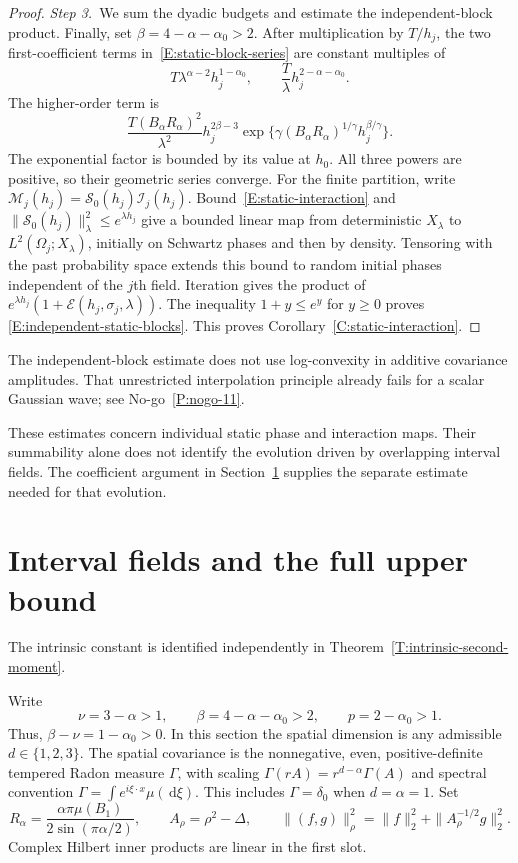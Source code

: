 \documentclass[12pt,oneside,openany]{book}
\numberwithin{equation}{section}
\theoremstyle{nogostyle}
\theoremstyle{definition}
\newcommand{\ud}{\,\mathrm{d}}
\begin{document}
\begin{proof}
  \medskip
  \noindent\textit{Step 3.~}We sum the dyadic budgets and estimate the
  independent-block product.
  Finally, set $\beta = 4-\alpha-\alpha_0 > 2$. After multiplication by $T/h_j$,
  the two first-coefficient terms in~\eqref{E:static-block-series} are constant
  multiples of
  \[
    T\lambda^{\alpha-2}h_j^{1-\alpha_0},\qquad
    \frac T\lambda h_j^{2-\alpha-\alpha_0}.
  \]
  The higher-order term is
  \[
    \frac{T(B_\alpha R_\alpha)^2}{\lambda^2}
    h_j^{2\beta-3}
    \exp\{\gamma(B_\alpha R_\alpha)^{1/\gamma}h_j^{\beta/\gamma}\}.
  \]
  The exponential factor is bounded by its value at $h_0$. All three powers are
  positive, so their geometric series converge. For the finite partition, write
  $\mathcal{M}_j(h_j) = \mathcal{S}_0(h_j)\mathcal{I}_j(h_j)$.
  Bound~\eqref{E:static-interaction} and $\|\mathcal{S}_0(h_j)\|_\lambda^2 \le
  e^{\lambda h_j}$ give a bounded linear map from deterministic $X_\lambda$ to
  $L^2(\Omega_j;X_\lambda)$, initially on Schwartz phases and then by density.
  Tensoring with the past probability space extends this bound to random initial
  phases independent of the $j$th field. Iteration gives the product of
  $e^{\lambda h_j}(1+\mathcal{E}(h_j,\sigma_j,\lambda))$. The inequality $1+y
  \le e^y$ for $y \ge 0$ proves \eqref{E:independent-static-blocks}. This proves
  Corollary~\ref{C:static-interaction}.
\end{proof}

The independent-block estimate does not use log-convexity in additive
covariance amplitudes. That unrestricted interpolation principle already
fails for a scalar Gaussian wave; see No-go~\ref{P:nogo-11}.


These estimates concern individual static phase and interaction maps. Their
summability alone does not identify the evolution driven by overlapping interval
fields. The coefficient argument in Section~\ref{S:interval-upper} supplies the
separate estimate needed for that evolution.

\section{Interval fields and the full upper bound}
\label{S:interval-upper}

The intrinsic constant is identified independently in
Theorem~\ref{T:intrinsic-second-moment}.

Write
\[
  \nu=3-\alpha>1,\qquad
  \beta=4-\alpha-\alpha_0>2,\qquad p=2-\alpha_0>1.
\]
Thus, $\beta-\nu = 1-\alpha_0 > 0$. In this section the spatial dimension is any
admissible $d \in \{1,2,3\}$. The spatial covariance is the nonnegative, even,
positive-definite tempered Radon measure $\Gamma$, with scaling $\Gamma(rA) =
r^{d-\alpha}\Gamma(A)$ and spectral convention $\Gamma = \int e^{i\xi\cdot
x}\mu(\ud\xi)$. This includes $\Gamma = \delta_0$ when $d = \alpha = 1$. Set
\[
  R_\alpha=\frac{\alpha\pi\mu(B_1)}{2\sin(\pi\alpha/2)},\qquad
  A_\rho=\rho^2-\Delta,\qquad
  \|(f,g)\|_\rho^2=\|f\|_2^2+\|A_\rho^{-1/2}g\|_2^2.
\]
Complex Hilbert inner products are linear in the first slot.
\end{document}
